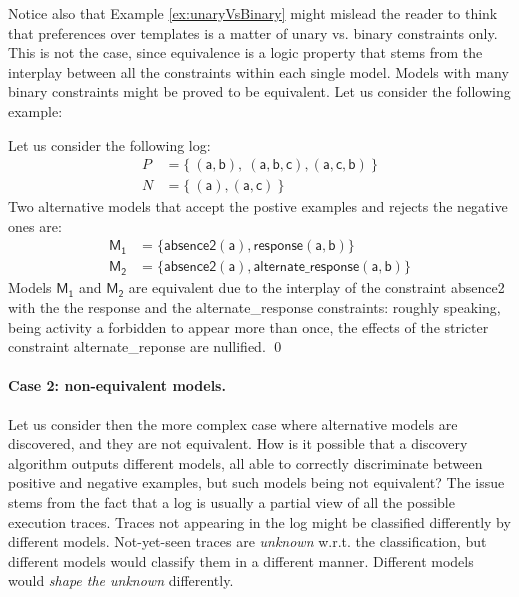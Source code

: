 Notice also that Example \ref{ex:unaryVsBinary} might mislead the reader to think that preferences over templates is a matter of unary vs. binary constraints only. This is not the case, since equivalence is a logic property that stems from the interplay between all the constraints within each single model. Models with many binary constraints might be proved to be equivalent. Let us consider the following example:

\begin{example}
\label{ex:alternateVsResponseEquiv}
Let us consider the following log:
\begin{align*}
P & = \{\ (\mathsf{a}, \mathsf{b}),\ (\mathsf{a}, \mathsf{b}, \mathsf{c}),(\mathsf{a}, \mathsf{c}, \mathsf{b})\ \} \\
N & = \{\ (\mathsf{a}), (\mathsf{a}, \mathsf{c})\ \}
\end{align*}
%
Two alternative models that accept the postive examples and rejects the negative ones are:
\begin{align*}
\mathsf{M_1} & = \{ \mathsf{absence2(a),response(a,b)}\} \\
\mathsf{M_2} & = \{ \mathsf{absence2(a),alternate\_response(a, b)}\}
\end{align*}
Models $\mathsf{M_1}$ and $\mathsf{M_2}$ are equivalent due to the interplay of the constraint \textsf{absence2} with the the \textsf{response} and the \textsf{alternate\_response} constraints: roughly speaking, being activity \textsf{a} forbidden to appear more than once, the effects of the stricter constraint \textsf{alternate\_reponse} are nullified.
\qed
\end{example}



\paragraph{Case 2: non-equivalent models.}
Let us consider then the more complex case where alternative models are discovered, and they are not equivalent. How is it possible that a discovery algorithm outputs different models, all able to correctly discriminate between positive and negative examples, but such models being not equivalent? The issue stems from the fact that a log is usually a partial view of all the possible execution traces. Traces not appearing in the log might be classified differently by different models. Not-yet-seen traces are \emph{unknown} w.r.t. the classification, but different models would classify them in a different manner. Different models would \emph{shape the unknown} differently.

